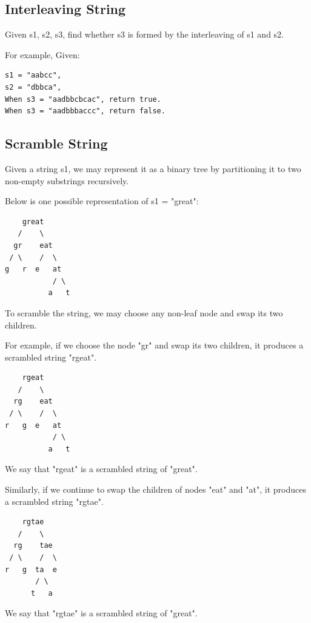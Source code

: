 \documentclass[12pt]{book}
\begin{document}
\subsection{Interleaving String}
\label{sec-14-3-6}
Given s1, s2, s3, find whether s3 is formed by the interleaving of s1 and s2.

For example, Given:
\lstset{language=java,label= ,caption= ,numbers=none}
\begin{lstlisting}
s1 = "aabcc",
s2 = "dbbca",
When s3 = "aadbbcbcac", return true.
When s3 = "aadbbbaccc", return false.
\end{lstlisting}

\subsection{Scramble String}
\label{sec-14-3-7}
Given a string s1, we may represent it as a binary tree by partitioning it to two non-empty substrings recursively.

Below is one possible representation of s1 = "great":

\lstset{language=java,label= ,caption= ,numbers=none}
\begin{lstlisting}
    great
   /    \
  gr    eat
 / \    /  \
g   r  e   at
           / \
          a   t
\end{lstlisting}

To scramble the string, we may choose any non-leaf node and swap its two children.

For example, if we choose the node "gr" and swap its two children, it produces a scrambled string "rgeat".

\lstset{language=java,label= ,caption= ,numbers=none}
\begin{lstlisting}
    rgeat
   /    \
  rg    eat
 / \    /  \
r   g  e   at
           / \
          a   t
\end{lstlisting}

We say that "rgeat" is a scrambled string of "great".

Similarly, if we continue to swap the children of nodes "eat" and "at", it produces a scrambled string "rgtae".

\lstset{language=java,label= ,caption= ,numbers=none}
\begin{lstlisting}
    rgtae
   /    \
  rg    tae
 / \    /  \
r   g  ta  e
       / \
      t   a
\end{lstlisting}

We say that "rgtae" is a scrambled string of "great".
\end{document}
